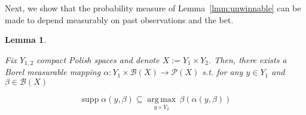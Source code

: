 \documentclass[11pt]{article}
\theoremstyle{definition}
\theoremstyle{plain}
\newtheorem{lemma}{Lemma}%
\newcommand{\Argmax}[1]{\underset{#1}{\operatorname{arg\,max}}\,}
\newcommand{\PM}{\mathcal{P}}
\DeclareMathOperator{\Sp}{supp}
\newcommand{\Gm}{\mathcal{B}}
\begin{document}
Next, we show that the probability measure of Lemma~\ref{lmm:unwinnable} can be made to depend measurably on past observations and the bet.

\begin{lemma}
\label{lmm:measurable_unwinnable}

Fix $Y_{1,2}$ compact Polish spaces and denote $X:=Y_1 \times Y_2$. Then, there exists a Borel measurable mapping $\alpha: Y_1 \times \Gm\left(X\right) \rightarrow \PM\left(X\right)$ s.t. for any $y \in Y_1$ and $\beta \in \Gm\left(X\right)$

\begin{equation}
\Sp \alpha\left(y,\beta\right) \subseteq \Argmax{y \times Y_2} \beta\left(\alpha\left(y,\beta\right)\right)
\end{equation}

\end{lemma}
\end{document}
